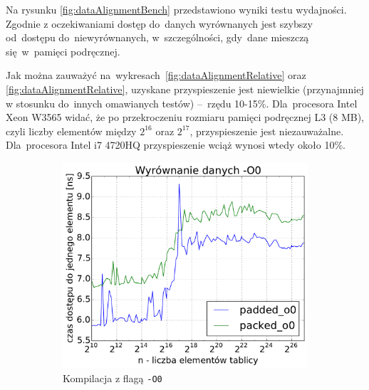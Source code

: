 Na rysunku \ref{fig:dataAlignmentBench} przedstawiono wyniki testu wydajności. Zgodnie z oczekiwaniami dostęp do~danych wyrównanych jest szybszy od~dostępu do~niewyrównanych, w~szczególności, gdy~dane mieszczą się~w~pamięci podręcznej.

Jak można zauważyć na~wykresach~\ref{fig:dataAlignmentRelative} oraz \ref{fig:dataAlignmentRelative}, uzyskane przyspieszenie jest niewielkie (przynajmniej w stosunku do~innych omawianych testów) --~rzędu 10-15\%. Dla~procesora Intel Xeon W3565 widać, że po przekroczeniu rozmiaru pamięci podręcznej L3 (8 MB), czyli liczby elementów między $2^{16}$ oraz $2^{17}$, przyspieszenie jest niezauważalne. Dla~procesora Intel i7 4720HQ przyspieszenie wciąż wynosi wtedy około 10\%.

\begin{figure}[!h]
    \centering
    \begin{subfigure}[c]{0.45\textwidth}
        \centering
        \includegraphics[width=\textwidth]{images/benchs/data_alignment_O0}
        \caption{Kompilacja z flagą \texttt{-O0}}
    \end{subfigure}
    ~
    \begin{subfigure}[c]{0.45\textwidth}
        \centering

\end{subfigure}
\end{figure}
